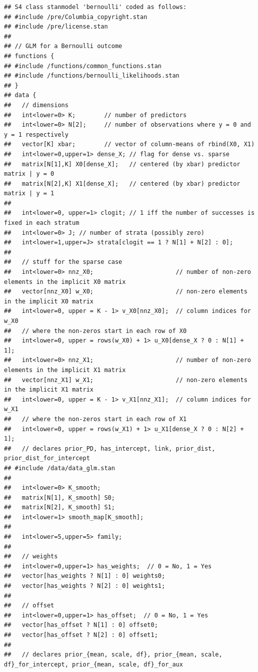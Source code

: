 \documentclass[
]{article}
\begin{document}
\begin{verbatim}
## S4 class stanmodel 'bernoulli' coded as follows:
## #include /pre/Columbia_copyright.stan
## #include /pre/license.stan
## 
## // GLM for a Bernoulli outcome
## functions {
## #include /functions/common_functions.stan
## #include /functions/bernoulli_likelihoods.stan
## }
## data {
##   // dimensions
##   int<lower=0> K;        // number of predictors
##   int<lower=0> N[2];     // number of observations where y = 0 and y = 1 respectively
##   vector[K] xbar;        // vector of column-means of rbind(X0, X1)
##   int<lower=0,upper=1> dense_X; // flag for dense vs. sparse
##   matrix[N[1],K] X0[dense_X];   // centered (by xbar) predictor matrix | y = 0
##   matrix[N[2],K] X1[dense_X];   // centered (by xbar) predictor matrix | y = 1
##   
##   int<lower=0, upper=1> clogit; // 1 iff the number of successes is fixed in each stratum
##   int<lower=0> J; // number of strata (possibly zero)
##   int<lower=1,upper=J> strata[clogit == 1 ? N[1] + N[2] : 0];
## 
##   // stuff for the sparse case
##   int<lower=0> nnz_X0;                       // number of non-zero elements in the implicit X0 matrix
##   vector[nnz_X0] w_X0;                       // non-zero elements in the implicit X0 matrix
##   int<lower=0, upper = K - 1> v_X0[nnz_X0];  // column indices for w_X0
##   // where the non-zeros start in each row of X0
##   int<lower=0, upper = rows(w_X0) + 1> u_X0[dense_X ? 0 : N[1] + 1]; 
##   int<lower=0> nnz_X1;                       // number of non-zero elements in the implicit X1 matrix
##   vector[nnz_X1] w_X1;                       // non-zero elements in the implicit X1 matrix
##   int<lower=0, upper = K - 1> v_X1[nnz_X1];  // column indices for w_X1
##   // where the non-zeros start in each row of X1
##   int<lower=0, upper = rows(w_X1) + 1> u_X1[dense_X ? 0 : N[2] + 1]; 
##   // declares prior_PD, has_intercept, link, prior_dist, prior_dist_for_intercept
## #include /data/data_glm.stan
## 
##   int<lower=0> K_smooth;
##   matrix[N[1], K_smooth] S0;
##   matrix[N[2], K_smooth] S1;
##   int<lower=1> smooth_map[K_smooth];
##   
##   int<lower=5,upper=5> family;
## 
##   // weights
##   int<lower=0,upper=1> has_weights;  // 0 = No, 1 = Yes
##   vector[has_weights ? N[1] : 0] weights0;
##   vector[has_weights ? N[2] : 0] weights1;
##   
##   // offset
##   int<lower=0,upper=1> has_offset;  // 0 = No, 1 = Yes
##   vector[has_offset ? N[1] : 0] offset0;
##   vector[has_offset ? N[2] : 0] offset1;
##   
##   // declares prior_{mean, scale, df}, prior_{mean, scale, df}_for_intercept, prior_{mean, scale, df}_for_aux

\end{verbatim}
\end{document}
